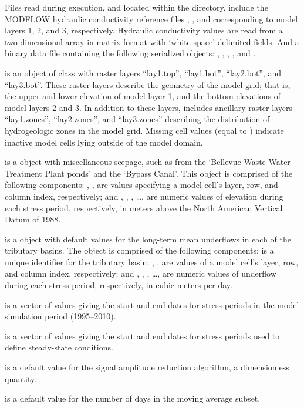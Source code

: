 \documentclass[a4paper]{book}
\begin{document}
\begin{Details}\relax
Files read during execution, and located within the  directory, include
the MODFLOW hydraulic conductivity reference files , , and 
corresponding to model layers 1, 2, and 3, respectively.
Hydraulic conductivity values are read from a two-dimensional array in matrix format with `white-space' delimited fields.
And a binary data file  containing the following serialized \R{} objects:
, , , , and .

 is an object of  class with raster layers
``lay1.top'', ``lay1.bot'', ``lay2.bot'', and ``lay3.bot''.
These raster layers describe the geometry of the model grid; that is,
the upper and lower elevation of model layer 1, and the bottom elevations of model layers 2 and 3.
In addition to these layers,  includes ancillary raster layers ``lay1.zones'', ``lay2.zones'', and ``lay3.zones''
describing the distribution of hydrogeologic zones in the model grid.
Missing cell values (equal to ) indicate inactive model cells lying outside of the model domain.

 is a  object with miscellaneous seepage,
such as from the `Bellevue Waste Water Treatment Plant ponds' and the `Bypass Canal'.
This object is comprised of the following components:
, ,  are  values specifying a model cell's layer, row, and column index, respectively; and
, , , \dots,  are numeric values of elevation during each stress period, respectively,
in meters above the North American Vertical Datum of 1988.

 is a  object with default values for the long-term mean underflows in each of the tributary basins.
The object is comprised of the following components:
 is a unique identifier for the tributary basin;
, ,  are  values of a model cell's layer, row, and column index, respectively; and
, , , \dots,  are numeric values of underflow during each stress period, respectively,
in cubic meters per day.

 is a vector of  values giving the start and end dates for stress periods in the model simulation period (1995--2010).

 is a vector of  values giving the start and end dates for stress periods used to define steady-state conditions.

 is a  default value for the signal amplitude reduction algorithm, a dimensionless quantity.

 is a  default value for the number of days in the moving average subset.
\end{Details}
\end{document}
